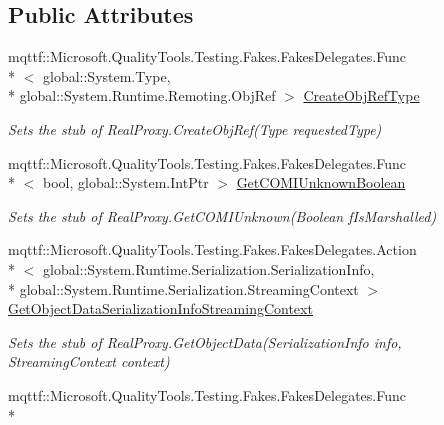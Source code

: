 \subsection*{Public Attributes}
\begin{DoxyCompactItemize}
\item 
mqttf\-::\-Microsoft.\-Quality\-Tools.\-Testing.\-Fakes.\-Fakes\-Delegates.\-Func\\*
$<$ global\-::\-System.\-Type, \\*
global\-::\-System.\-Runtime.\-Remoting.\-Obj\-Ref $>$ \hyperlink{class_system_1_1_runtime_1_1_remoting_1_1_proxies_1_1_fakes_1_1_stub_real_proxy_ae40ab7bdc0dda791dbef931814d1fb6d}{Create\-Obj\-Ref\-Type}
\begin{DoxyCompactList}\small\item\em Sets the stub of Real\-Proxy.\-Create\-Obj\-Ref(\-Type requested\-Type)\end{DoxyCompactList}\item 
mqttf\-::\-Microsoft.\-Quality\-Tools.\-Testing.\-Fakes.\-Fakes\-Delegates.\-Func\\*
$<$ bool, global\-::\-System.\-Int\-Ptr $>$ \hyperlink{class_system_1_1_runtime_1_1_remoting_1_1_proxies_1_1_fakes_1_1_stub_real_proxy_ad48faec0fed1ab5a608c8c50b598f3f2}{Get\-C\-O\-M\-I\-Unknown\-Boolean}
\begin{DoxyCompactList}\small\item\em Sets the stub of Real\-Proxy.\-Get\-C\-O\-M\-I\-Unknown(\-Boolean f\-Is\-Marshalled)\end{DoxyCompactList}\item 
mqttf\-::\-Microsoft.\-Quality\-Tools.\-Testing.\-Fakes.\-Fakes\-Delegates.\-Action\\*
$<$ global\-::\-System.\-Runtime.\-Serialization.\-Serialization\-Info, \\*
global\-::\-System.\-Runtime.\-Serialization.\-Streaming\-Context $>$ \hyperlink{class_system_1_1_runtime_1_1_remoting_1_1_proxies_1_1_fakes_1_1_stub_real_proxy_a871df9326c85bccecfef66c12e95f439}{Get\-Object\-Data\-Serialization\-Info\-Streaming\-Context}
\begin{DoxyCompactList}\small\item\em Sets the stub of Real\-Proxy.\-Get\-Object\-Data(\-Serialization\-Info info, Streaming\-Context context)\end{DoxyCompactList}\item 
mqttf\-::\-Microsoft.\-Quality\-Tools.\-Testing.\-Fakes.\-Fakes\-Delegates.\-Func\\*

\end{DoxyCompactItemize}
